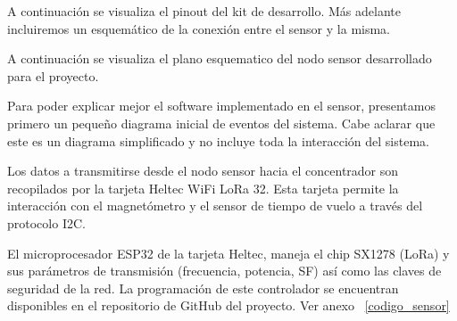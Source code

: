 A continuación se visualiza el pinout del kit de desarrollo. Más adelante incluiremos un
esquemático de la conexión entre el sensor y la misma.





A continuación se visualiza el plano esquematico del nodo sensor desarrollado para el proyecto.

Para poder explicar mejor el software implementado en el sensor, presentamos primero un
pequeño diagrama inicial de eventos del sistema. Cabe aclarar que este es un diagrama
simplificado y no incluye toda la interacción del sistema.


Los datos a transmitirse desde el nodo sensor hacia el concentrador son recopilados por
la tarjeta Heltec WiFi LoRa 32. Esta tarjeta permite la interacción con el magnetómetro
y el sensor de tiempo de vuelo a través del protocolo I2C.

El microprocesador ESP32 de la tarjeta Heltec, maneja el chip SX1278 (LoRa) y sus
parámetros de transmisión (frecuencia, potencia, SF) así como las claves de seguridad de
la red. La programación de este controlador se encuentran disponibles en el repositorio
de GitHub del proyecto. Ver anexo ~\ref{codigo_sensor}

